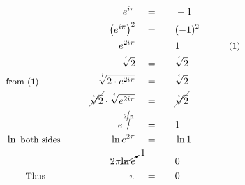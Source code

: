 \begin{alignat*}{5}
&\,&e^{i\pi}\quad&=\quad&&-1\\
&\,&\left(e^{i\pi}\right)^2\quad&=\quad&&(-1)^2\\
&\,&e^{2i\pi}\quad&=&&1\qquad\qquad&\small\text{(1)}\\
&\,&\sqrt[^i]{2}\quad&=&&\sqrt[^i]{2}\\
&\small\text{from (1)}&\sqrt[^i]{2\cdot e^{2i\pi}}\quad&=&&\sqrt[^i]{2}\\
&\,&\cancel{\sqrt[^i]{2}}\cdot\sqrt[^i]{e^{2i\pi}}\quad&=&&\cancel{\sqrt[^i]{2}}\\
&\,&e^{\frac{2\cancel{i}\pi}{\cancel{i}}}\quad&=&&1\\
&\small\ln{}\text{ both sides}\normalsize\qquad&\ln{e^{2\pi}}\quad&=&&\ln{1}\\
&\,&2\pi\cancelto{1}{\ln{e}}\quad&=&&0\\
&\qquad\small\text{Thus}&\pi\quad&=&&0
\end{alignat*}
